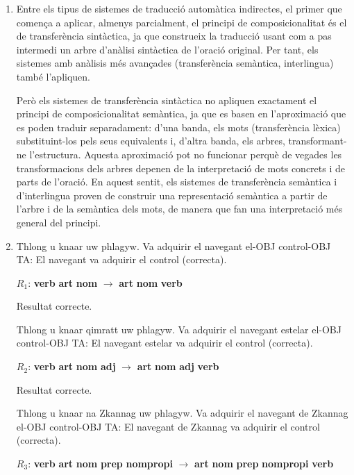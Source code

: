 \begin{enumerate}
\item Entre els tipus de sistemes de traducció automàtica indirectes,
  el primer que comença a aplicar, almenys parcialment, el principi de
  composicionalitat és el de transferència sintàctica, ja que
  construeix la traducció usant com a pas intermedi un arbre d'anàlisi
  sintàctica de l'oració original. Per tant, els sistemes amb anàlisis
  més avançades (transferència semàntica, interlingua) també
  l'apliquen.

  Però els sistemes de transferència sintàctica no apliquen exactament
  el principi de composicionalitat semàntica, ja que es basen en
  l'aproximació que es poden traduir separadament: d'una banda, els
  mots (transferència lèxica) substituint-los pels seus equivalents i,
  d'altra banda, els arbres, transformant-ne l'estructura. Aquesta
  aproximació pot no funcionar perquè de vegades les transformacions
  dels arbres depenen de la interpretació de mots concrets i de parts
  de l'oració. En aquest sentit, els sistemes de transferència
  semàntica i d'interlingua proven de construir una representació
  semàntica a partir de l'arbre i de la semàntica dels mots, de manera
  que fan una interpretació més general del principi.

\item
     \begin{example}
     \gll Thlong u knaar uw phlagyw.
          {Va adquirir} el navegant el-OBJ control-OBJ
     \glt TA: El navegant va adquirir el control (correcta).
     \glend
     \end{example}
     $R_1$: \textbf{verb} \textbf{art} \textbf{nom} $\rightarrow$
     \textbf{art} \textbf{nom} \textbf{verb}

     Resultat correcte.

     \begin{example}
     \gll Thlong u knaar qimratt uw phlagyw.
          {Va adquirir} el navegant estelar el-OBJ control-OBJ
     \glt TA: El navegant estelar va adquirir el control (correcta).
     \glend
     \end{example}
     $R_2$: \textbf{verb} \textbf{art} \textbf{nom} \textbf{adj} $\rightarrow$
     \textbf{art} \textbf{nom} \textbf{adj} \textbf{verb} 
     \begin{example}
 
     Resultat correcte.

     \gll Thlong u knaar na Zkannag uw phlagyw.
          {Va adquirir} el navegant de Zkannag el-OBJ control-OBJ
     \glt TA: El navegant de Zkannag va adquirir el control (correcta).
     \glend
     \end{example}
     $R_3$: \textbf{verb} \textbf{art} \textbf{nom} \textbf{prep}
     \textbf{nompropi} $\rightarrow$ \textbf{art} \textbf{nom}
     \textbf{prep} \textbf{nompropi} \textbf{verb}


\end{enumerate}
